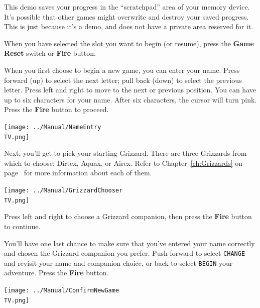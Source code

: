 \documentclass[10pt,twocolumn,openany,article]{memoir}
\newcommand\TV{NTSC}
\newcommand\TV{PAL}
\newcommand\TV{SECAM}
\begin{document}
\ifdefined\DEMO

\skip

This demo saves your progress in  the ``scratchpad'' area of your memory
device. It's possible that other  games might overwrite and destroy your
saved progress.  This is  just because  it's a demo,  and does  not have
a private area reserved for it.

\skip

\fi

When you have selected the slot you want to begin (or resume), press the
\textbf{Game Reset} switch or \textbf{Fire} button.

\fi

\ifdefined\NOSAVE\else

When you  first choose  to begin a  new game, you  can enter  your name.
Press forward (up) to select the next letter; pull back (down) to select
the  previous letter.  Press  left and  right  to move  to  the next  or
previous position.  You can  have up  to six  characters for  your name.
After six characters, the cursor will turn pink. Press the \textbf{Fire}
button to proceed.

\begin{center}
  \texttt{[image: ../Manual/NameEntry\\TV.png]}
\end{center}

\ifdefined\DEMO\else

Next,  you'll  get to  pick  your  starting  Grizzard. There  are  three
Grizzards  from which  to  choose:  Dirtex, Aquax,  or  Airex. Refer  to
Chapter~\ref{ch:Grizzards}   on  page~\pageref{ch:Grizzards}   for  more
information about each of them.

\begin{center}
  \texttt{[image: ../Manual/GrizzardChooser\\TV.png]}
\end{center}

Press left  and right  to choose  a Grizzard  companion, then  press the
\textbf{Fire} button to continue.

You'll have one  last chance to make sure that  you've entered your name
correctly and chosen the Grizzard  companion you prefer. Push forward to
select \texttt{CHANGE}  and revisit your  name and companion  choice, or
back   to    select   \texttt{BEGIN}    your   adventure.    Press   the
\textbf{Fire} button.

\begin{center}
  \texttt{[image: ../Manual/ConfirmNewGame\\TV.png]}
\end{center}
\end{document}
